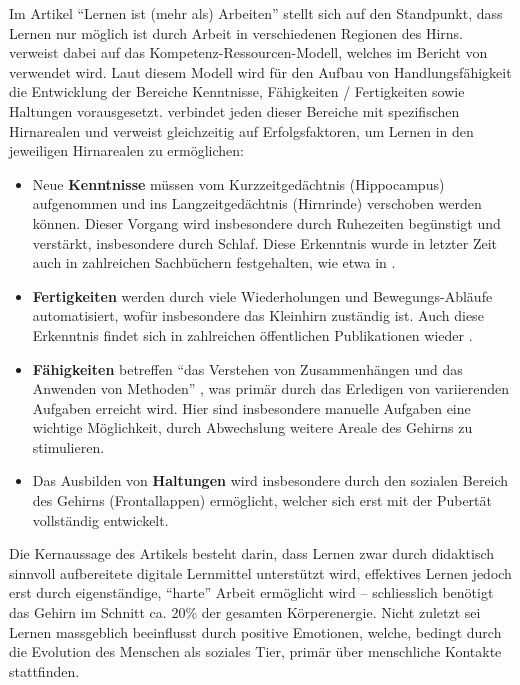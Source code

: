Im Artikel ``Lernen ist (mehr als) Arbeiten'' stellt sich \textcite{nzzfolio} auf den Standpunkt, dass Lernen nur möglich ist durch Arbeit in verschiedenen Regionen des Hirns. \textcite{nzzfolio} verweist dabei auf das Kompetenz-Ressourcen-Modell, welches im Bericht von \textcite{sbfi2} verwendet wird. Laut diesem Modell wird für den Aufbau von Handlungsfähigkeit die Entwicklung der Bereiche Kenntnisse, Fähigkeiten / Fertigkeiten sowie Haltungen vorausgesetzt. \textcite{nzzfolio} verbindet jeden dieser Bereiche mit spezifischen Hirnarealen und verweist gleichzeitig auf Erfolgsfaktoren, um Lernen in den jeweiligen Hirnarealen zu ermöglichen:
\begin{itemize}
\item Neue \textbf{Kenntnisse} müssen vom Kurzzeitgedächtnis (Hippocampus) aufgenommen und ins Langzeitgedächtnis (Hirnrinde) verschoben werden können. Dieser Vorgang wird insbesondere durch Ruhezeiten begünstigt und verstärkt, insbesondere durch Schlaf. Diese Erkenntnis wurde in letzter Zeit auch in zahlreichen Sachbüchern festgehalten, wie etwa in \parencite{alma99116800416405511}.
\item \textbf{Fertigkeiten} werden durch viele Wiederholungen und Bewegungs-Abläufe automatisiert, wofür insbesondere das Kleinhirn zuständig ist. Auch diese Erkenntnis findet sich in zahlreichen öffentlichen Publikationen wieder \cite{huberman}.
\item \textbf{Fähigkeiten} betreffen ``das Verstehen von Zusammenhängen und das Anwenden von Methoden'' \parencite{nzzfolio}, was primär durch das Erledigen von variierenden Aufgaben erreicht wird. Hier sind insbesondere manuelle Aufgaben eine wichtige Möglichkeit, durch Abwechslung weitere Areale des Gehirns zu stimulieren.
\item Das Ausbilden von \textbf{Haltungen} wird insbesondere durch den sozialen Bereich des Gehirns (Frontallappen) ermöglicht, welcher sich erst mit der Pubertät vollständig entwickelt.
\end{itemize}

Die Kernaussage des Artikels besteht darin, dass Lernen zwar durch didaktisch sinnvoll aufbereitete digitale Lernmittel unterstützt wird, effektives Lernen jedoch erst durch eigenständige, ``harte'' Arbeit ermöglicht wird -- schliesslich benötigt das Gehirn im Schnitt ca. 20\% der gesamten Körperenergie. Nicht zuletzt sei Lernen massgeblich beeinflusst durch positive Emotionen, welche, bedingt durch die Evolution des Menschen als soziales Tier, primär über menschliche Kontakte stattfinden.

